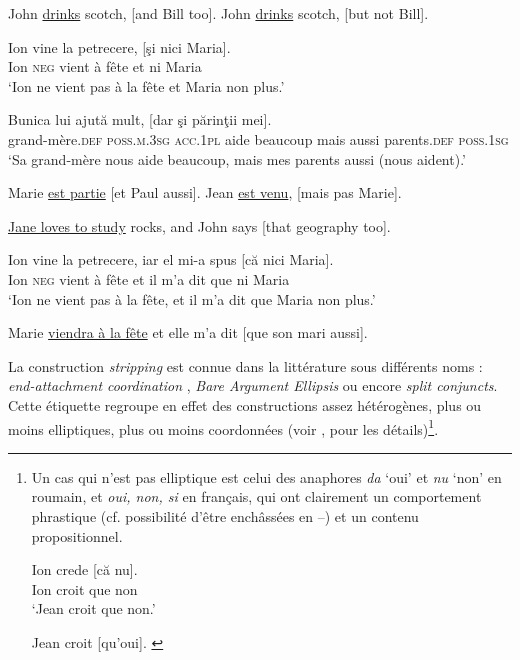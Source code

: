 \ea
\ea  John \uline{drinks} scotch, [and Bill too]. \label{ch1:ex54a} 
\ex  John \uline{drinks} scotch, [but not Bill]. \label{ch1:ex54b} 
\z
\z

\ea \label{ch1:ex55}
\ea
\gll   Ion  vine la petrecere,  [şi  nici  Maria].\\
Ion  \textsc{neg}  vient  à  fête  et  ni  Maria \\
\glt ‘Ion ne vient pas à la fête et Maria non plus.’ 

\ex
\gll   Bunica  lui   ajută mult,  [dar  şi  părinţii  mei].\\
  grand-mère.\textsc{def}  \textsc{poss.m.3sg} \textsc{acc.1pl}  aide  beaucoup  mais  aussi  parents.\textsc{def} \textsc{poss.1sg} \\
\glt ‘Sa grand-mère nous aide beaucoup, mais mes parents aussi (nous aident).’ 
\z
\z

\newpage 
\ea \label{ch1:ex56}
\ea  Marie \uline{est partie} [et Paul aussi]. 
\ex  Jean \uline{est venu}, [mais pas Marie].     
\z
\z

\ea
\ea  *\uline{Jane loves to study} rocks, and John says [that geography too]. \citep[27]{Lobeck1995} \label{ch1:ex57a}

\ex
\gll  Ion   vine la petrecere,  iar el mi-a spus  [că  nici  Maria]. \label{ch1:ex57b}\\
    Ion  \textsc{neg}  vient  à  fête  et il m'a dit  que  ni  Maria \\
\glt ‘Ion ne vient pas à la fête, et il m'a dit que Maria non plus.’ 

\ex  Marie \uline{viendra à la fête} et elle m'a dit [que son mari aussi]. \label{ch1:ex57c}
\z
\z

La construction \textit{stripping} est connue dans la littérature sous différents {noms :} \textit{end-attachment coordination} \citep{HuddlestonEtAl2002}, \textit{Bare Argument Ellipsis} \citep{Wilder1997,CulicoverEtAl2005} ou encore \textit{split conjuncts}. Cette étiquette regroupe en effet des constructions assez hétérogènes, plus ou moins elliptiques, plus ou moins coordonnées (voir \citealt{Abeille2005}, \citealt{Abeille2006} pour les détails)\footnote{Un cas qui n’est pas elliptique est celui des anaphores \textit{da} ‘oui’ et \textit{nu} ‘non’ en roumain, et \textit{oui, non, si} en français, qui ont clairement un comportement phrastique (cf. possibilité d’être enchâssées en --) et un contenu propositionnel.

\ea
\gll Ion  crede  [că  nu]. \label{ch1:foot22:exi}\\
Ion  croit  que  non \\ 
\glt ‘Jean croit que non.’
\z

\ea
Jean croit [qu’oui]. \label{ch1:foot22:exii}
\z

}.  



